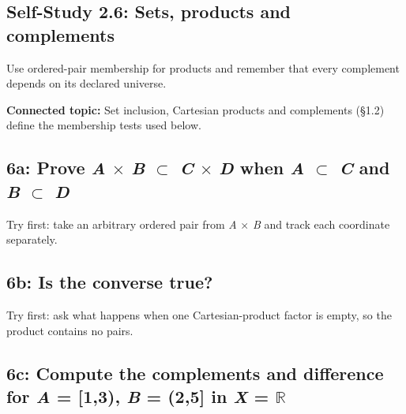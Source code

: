\documentclass[11pt]{article}
\begin{document}
\begin{keepsection}
\section{Self-Study 2.6: Sets, products and complements}

Use ordered-pair membership for products and remember that every complement depends on its declared universe.

\textbf{Connected topic:} Set inclusion, Cartesian products and complements (§1.2) define the membership tests used below.

\begin{keepsection}
\subsection{6a: Prove \textit{A} \ensuremath{\times} \textit{B} \ensuremath{\subset} \textit{C} \ensuremath{\times} \textit{D} when \textit{A} \ensuremath{\subset} \textit{C} and \textit{B} \ensuremath{\subset} \textit{D}}

Try first: take an arbitrary ordered pair from \textit{A} \ensuremath{\times} \textit{B} and track each coordinate separately.

\end{keepsection}

\begin{keepsection}
\subsection{6b: Is the converse true?}

Try first: ask what happens when one Cartesian-product factor is empty, so the product contains no pairs.

\end{keepsection}

\begin{keepsection}
\subsection{6c: Compute the complements and difference for \textit{A} = [1,3), \textit{B} = (2,5] in \textit{X} = \ensuremath{\mathbb{R}}}


\end{keepsection}
\end{keepsection}
\end{document}
